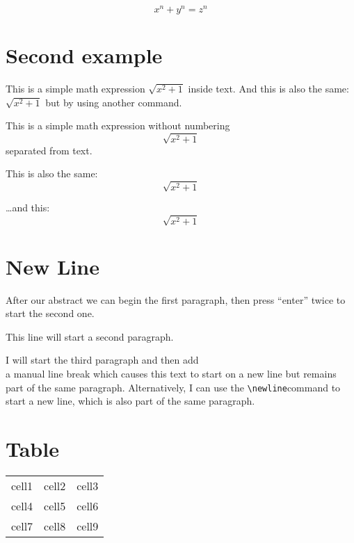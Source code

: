 \documentclass{article}
\begin{document}
\[ x^n + y^n = z^n \]

\section{Second example}

This is a simple math expression \(\sqrt{x^2+1}\) inside text. 
And this is also the same: 
\begin{math}
\sqrt{x^2+1}
\end{math}
but by using another command.

This is a simple math expression without numbering
\[\sqrt{x^2+1}\] 
separated from text.

This is also the same:
\begin{displaymath}
\sqrt{x^2+1}
\end{displaymath}

\ldots and this:
\begin{equation*}
\sqrt{x^2+1}
\end{equation*}


\section{New Line}

After our abstract we can begin the first paragraph, then press ``enter'' twice to start the second one.

This line will start a second paragraph.

I will start the third paragraph and then add \\ a manual line break which causes this text to start on a new line but remains part of the same paragraph. Alternatively, I can use the \verb|\newline|\newline command to start a new line, which is also part of the same paragraph.


\section{Table}

\begin{center}
\begin{tabular}{c c c}
  cell1 & cell2 & cell3 \\ 
  cell4 & cell5 & cell6 \\  
  cell7 & cell8 & cell9    
\end{tabular}
\end{center}
\end{document}
